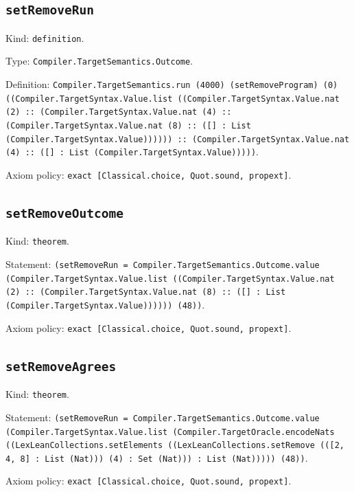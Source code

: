 \documentclass[11pt]{article}
\begin{document}
\subsection*{\texttt{setRemoveRun}}
\noindent Kind: \texttt{definition}.\par
\noindent Type: \texttt{Compiler.TargetSemantics.Outcome}.\par
\noindent Definition: \texttt{Compiler.TargetSemantics.run (4000) (setRemoveProgram) (0) ((Compiler.TargetSyntax.Value.list ((Compiler.TargetSyntax.Value.nat (2) :: (Compiler.TargetSyntax.Value.nat (4) :: (Compiler.TargetSyntax.Value.nat (8) :: ([] : List (Compiler.TargetSyntax.Value)))))) :: (Compiler.TargetSyntax.Value.nat (4) :: ([] : List (Compiler.TargetSyntax.Value)))))}.\par
\noindent Axiom policy: \texttt{exact [Classical.choice, Quot.sound, propext]}.\par
\subsection*{\texttt{setRemoveOutcome}}
\noindent Kind: \texttt{theorem}.\par
\noindent Statement: \texttt{(setRemoveRun = Compiler.TargetSemantics.Outcome.value (Compiler.TargetSyntax.Value.list ((Compiler.TargetSyntax.Value.nat (2) :: (Compiler.TargetSyntax.Value.nat (8) :: ([] : List (Compiler.TargetSyntax.Value)))))) (48))}.\par
\noindent Axiom policy: \texttt{exact [Classical.choice, Quot.sound, propext]}.\par
\subsection*{\texttt{setRemoveAgrees}}
\noindent Kind: \texttt{theorem}.\par
\noindent Statement: \texttt{(setRemoveRun = Compiler.TargetSemantics.Outcome.value (Compiler.TargetSyntax.Value.list (Compiler.TargetOracle.encodeNats ((LexLeanCollections.setElements ((LexLeanCollections.setRemove (([2, 4, 8] : List (Nat))) (4) : Set (Nat))) : List (Nat))))) (48))}.\par
\noindent Axiom policy: \texttt{exact [Classical.choice, Quot.sound, propext]}.\par
\end{document}
